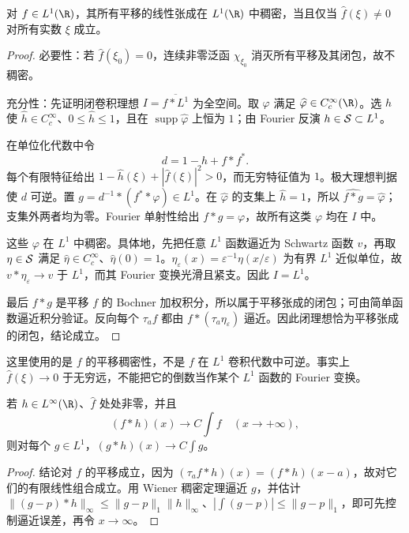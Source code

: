 \begin{theorem}\label{thm:y11-wiener}
对 $f\in L^1(\R)$，其所有平移的线性张成在 $L^1(\R)$ 中稠密，当且仅当 $\widehat f(\xi)\ne0$ 对所有实数 $\xi$ 成立。
\end{theorem}
\begin{proof}
必要性：若 $\widehat f(\xi_0)=0$，连续非零泛函 $\chi_{\xi_0}$ 消灭所有平移及其闭包，故不稠密。

充分性：先证明闭卷积理想 $I=\overline{f*L^1}$ 为全空间。取 $\varphi$ 满足 $\widehat\varphi\in C_c^\infty(\R)$。选 $h$ 使 $\widehat h\in C_c^\infty$、$0\le\widehat h\le1$，且在 $\operatorname{supp}\widehat\varphi$ 上恒为 $1$；由 Fourier 反演 $h\in\mathcal{S}\subset L^1$。
\par{}
在单位化代数中令
\[
 d=1-h+f*f^*.
\]
每个有限特征给出 $1-\widehat h(\xi)+|\widehat f(\xi)|^2>0$，而无穷特征值为 $1$。极大理想判据使 $d$ 可逆。置 $g=d^{-1}*(f^* *\varphi)\in L^1$。在 $\widehat\varphi$ 的支集上 $\widehat h=1$，所以 $\widehat{f*g}=\widehat\varphi$；支集外两者均为零。Fourier 单射性给出 $f*g=\varphi$，故所有这类 $\varphi$ 均在 $I$ 中。

这些 $\varphi$ 在 $L^1$ 中稠密。具体地，先把任意 $L^1$ 函数逼近为 Schwartz 函数 $v$，再取 $\eta\in\mathcal{S}$ 满足 $\widehat\eta\in C_c^\infty$、$\widehat\eta(0)=1$。$\eta_\varepsilon(x)=\varepsilon^{-1}\eta(x/\varepsilon)$ 为有界 $L^1$ 近似单位，故 $v*\eta_\varepsilon\to v$ 于 $L^1$，而其 Fourier 变换光滑且紧支。因此 $I=L^1$。

最后 $f*g$ 是平移 $f$ 的 Bochner 加权积分，所以属于平移张成的闭包；可由简单函数逼近积分验证。反向每个 $\tau_af$ 都由 $f*(\tau_a\eta_\varepsilon)$ 逼近。因此闭理想恰为平移张成的闭包，结论成立。
\end{proof}

这里使用的是 $f$ 的平移稠密性，不是 $f$ 在 $L^1$ 卷积代数中可逆。事实上 $\widehat f(\xi)\to0$ 于无穷远，不能把它的倒数当作某个 $L^1$ 函数的 Fourier 变换。

\begin{corollary}\label{cor:y11-tauber-transfer}
若 $h\in L^\infty(\R)$、$\widehat f$ 处处非零，并且
\[
 (f*h)(x)\longrightarrow C\int f\quad(x\to+\infty),
\]
则对每个 $g\in L^1$，$(g*h)(x)\to C\int g$。
\end{corollary}
\begin{proof}
结论对 $f$ 的平移成立，因为 $(\tau_af*h)(x)=(f*h)(x-a)$，故对它们的有限线性组合成立。用 Wiener 稠密定理逼近 $g$，并估计 $\|(g-p)*h\|_\infty\le\|g-p\|_1\|h\|_\infty$、$|\int(g-p)|\le\|g-p\|_1$，即可先控制逼近误差，再令 $x\to\infty$。
\end{proof}

